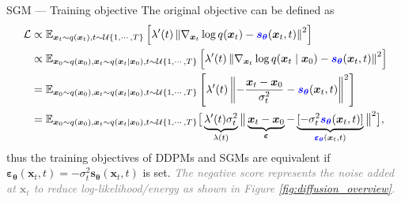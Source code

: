 \documentclass[10pt]{beamer}
\begin{document}
\begin{frame}{SGM --- \normalsize Training objective}
    The original objective can be defined as
    {\small\begin{align}
        \mathcal{L} 
        & \propto \mathbb{E}_{\bm{x}_t\sim q(\bm{x}_t),t\sim\mathcal{U}\{1,\cdots,T\}}
        \left[\lambda'(t)\left\|
            \nabla_{\bm{x}_t}\log q(\bm{x}_t) - \textcolor{blue}{\bm{s}_{\bm{\theta}}}(\bm{x}_t, t)
        \right\|^2\right] \notag\\
        & \propto \mathbb{E}_{\bm{x}_0\sim q(\bm{x}_0),\bm{x}_t\sim q(\bm{x}_t\mid\bm{x}_0),t\sim\mathcal{U}\{1,\cdots,T\}}
        \left[\lambda'(t)\left\|
            \nabla_{\bm{x}_t}\log q(\bm{x}_t\mid\bm{x}_0) - \textcolor{blue}{\bm{s}_{\bm{\theta}}}(\bm{x}_t, t)
        \right\|^2\right] \label{eq:sgmvarobj}\\
        & = \mathbb{E}_{\bm{x}_0\sim q(\bm{x}_0),\bm{x}_t\sim q(\bm{x}_t\mid\bm{x}_0),t\sim\mathcal{U}\{1,\cdots,T\}}
        \left[\lambda'(t)\left\|
            - \frac{\bm{x}_t - \bm{x}_0}{\sigma_t^2} - \textcolor{blue}{\bm{s}_{\bm{\theta}}}(\bm{x}_t, t)
        \right\|^2\right] \notag\\
        & = \mathbb{E}_{\bm{x}_0\sim q(\bm{x}_0),\bm{x}_t\sim q(\bm{x}_t\mid\bm{x}_0),t\sim\mathcal{U}\{1,\cdots,T\}}
        \big[\underbrace{\lambda'(t)\sigma_t^2}_{\lambda(t)}\big\|
            \underbrace{\bm{x}_t - \bm{x}_0}_{\bm{\varepsilon}} - 
            \underbrace{[- \sigma_t^2\textcolor{blue}{\bm{s}_{\bm{\theta}}}(\bm{x}_t, t)]}_{\textcolor{blue}{\bm{\varepsilon}_{\bm{\theta}}}(\bm{x}_t, t)}
        \big\|^2\big],\notag
    \end{align}}
    thus the training objectives of DDPMs and SGMs are equivalent if $\bm{\varepsilon}_{\bm{\theta}}(\bm{x}_t,t)=-\sigma_t^2\bm{s}_{\bm{\theta}}(\bm{x}_t,t)$ is set. \textcolor{gray}{\textit{The negative score represents the noise added at $\bm{x}_t$ to reduce log-likelihood/energy as shown in Figure \ref{fig:diffusion_overview}.}}
\end{frame}
\end{document}
